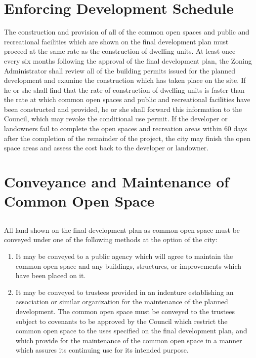 \section{Enforcing Development Schedule}
The construction and provision of all of the common open spaces and public and recreational facilities which are shown on the final development plan must proceed at the same rate as the construction of dwelling units. At least once every six months following the approval of the final development plan, the Zoning Administrator shall review all of the building permits issued for the planned development and examine the construction which has taken place on the site. If he or she shall find that the rate of construction of dwelling units is faster than the rate at which common open spaces and public and recreational facilities have been constructed and provided, he or she shall forward this information to the Council, which may revoke the conditional use permit. If the developer or landowners fail to complete the open spaces and recreation areas within 60 days after the completion of the remainder of the project, the city may finish the open space areas and assess the cost back to the developer or landowner.

\section{Conveyance and Maintenance of Common Open Space}
\subsection{}
All land shown on the final development plan as common open space must be conveyed under one of the following methods at the option of the city:
\begin{enumerate}[{\indent}1)]
    \item It may be conveyed to a public agency which will agree to maintain the common open space and any buildings, structures, or improvements which have been placed on it.
    \item It may be conveyed to trustees provided in an indenture establishing an association or similar organization for the maintenance of the planned development. The common open space must be conveyed to the trustees subject to covenants to be approved by the Council which restrict the common open space to the uses specified on the final development plan, and which provide for the maintenance of the common open space in a manner which assures its continuing use for its intended purpose.
\end{enumerate}
